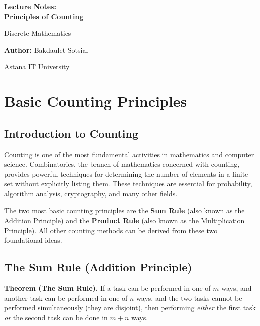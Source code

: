 \documentclass[11pt,a4paper]{article}
\begin{document}
\begin{titlepage}
    \centering
    \vspace*{4cm}
    
    {\Huge\bfseries Lecture Notes:\\ Principles of Counting\par}
    \vspace{1cm}
    {\Large Discrete Mathematics\par}
    \vspace{2cm}
    {\large \textbf{Author:} Bakdaulet Sotsial\par}
    \vspace{1cm}
    
    \vfill
    {\small Astana IT University \par}
    \vspace*{2cm}
\end{titlepage}

\tableofcontents
\newpage

\section{Basic Counting Principles}

\subsection{Introduction to Counting}

Counting is one of the most fundamental activities in mathematics and computer science. Combinatorics, the branch of mathematics concerned with counting, provides powerful techniques for determining the number of elements in a finite set without explicitly listing them. These techniques are essential for probability, algorithm analysis, cryptography, and many other fields.

The two most basic counting principles are the \textbf{Sum Rule} (also known as the Addition Principle) and the \textbf{Product Rule} (also known as the Multiplication Principle). All other counting methods can be derived from these two foundational ideas.

\subsection{The Sum Rule (Addition Principle)}

\textbf{Theorem (The Sum Rule).} If a task can be performed in one of $m$ ways, and another task can be performed in one of $n$ ways, and the two tasks cannot be performed simultaneously (they are disjoint), then performing \textit{either} the first task \textit{or} the second task can be done in $m + n$ ways.
\end{document}
